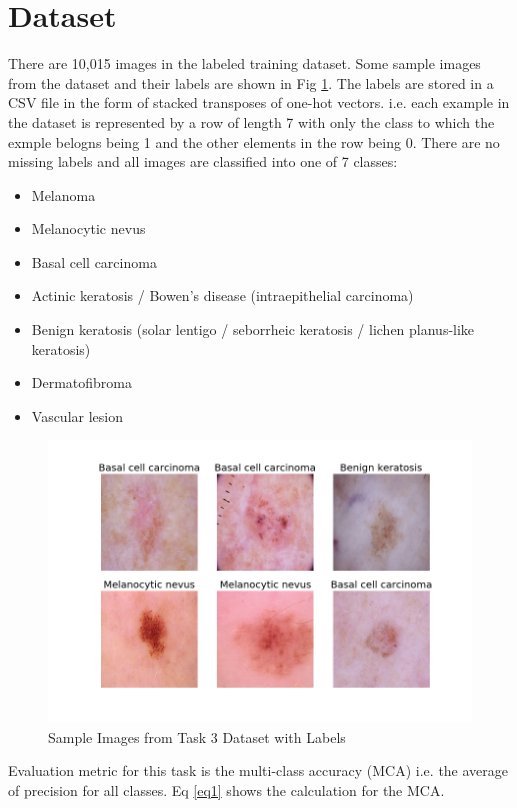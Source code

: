 \documentclass[conference]{IEEEtran}
\begin{document}
    \section{Dataset}\label{dataset}

There are 10,015 images in the labeled training dataset.\cite{tschandl2018ham10000} Some sample
images from the dataset and their labels are shown in Fig \ref{fig1}. The labels are stored in a CSV file in the form of stacked transposes of one-hot vectors. i.e. each example in the dataset is represented by a row of length 7 with only the class to which the exmple belogns being 1 and the other elements in the row being 0. There are no missing
labels and all images are classified into one of 7 classes: 
\begin{itemize}
\item Melanoma
\item Melanocytic nevus 
\item Basal cell carcinoma
\item Actinic keratosis / Bowen's disease (intraepithelial carcinoma)
\item Benign keratosis (solar lentigo / seborrheic keratosis / lichen planus-like keratosis) 
\item Dermatofibroma
\item Vascular lesion
\end{itemize}

\begin{figure}[htbp]
\centerline{\includegraphics[width=\columnwidth]{Task3-Imgs.png}}
\caption{Sample Images from Task 3 Dataset with Labels}
\label{fig1}
\end{figure}

 Evaluation metric for this task is the multi-class accuracy (MCA) i.e. the average of precision for all classes. Eq \ref{eq1} shows the calculation for the MCA.
\end{document}

